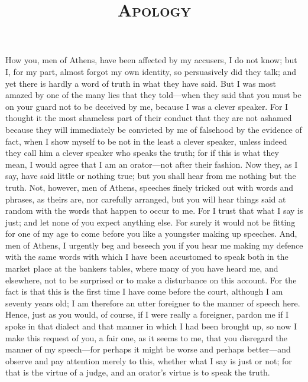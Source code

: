 \documentclass[letterpaper,12pt]{article}
\title{\vspace{-2.5cm} \scshape Apology \vspace{-8mm}}
\author{}
\date{
	\vspace{-1em}
		\small \fontfamily{ppl}\selectfont Written by Plato, translated by Harold North Fowler, 1966
	\vspace{-0.5em}
	\begin{center}
		\hrulefill
	\end{center}
		\vspace{-1em}
	}
\newcommand{\stephpag}[1]{\marginnote{\small\itshape\fontfamily{ppl}\selectfont #1}}
\begin{document}
\begin{minipage}{15.45cm}
\maketitle

\end{minipage}
\setlength{\parindent}{2em}

\stephpag{17 a}How you, men of Athens, have been affected by my accusers, I do not know; but I, for my part, almost forgot my own identity, so persuasively did they talk; and yet there is hardly a word of truth in what they have said. But I was most amazed by one of the many lies that they told---when they said that you must be on your guard not to be deceived by me, \stephpag{b} because I was a clever speaker. For I thought it the most shameless part of their conduct that they are not ashamed because they will immediately be convicted by me of falsehood by the evidence of fact, when I show myself to be not in the least a clever speaker, unless indeed they call him a clever speaker who speaks the truth; for if this is what they mean, I would agree that I am an orator---not after their fashion. Now they, as I say, have said little or nothing true; but you shall hear from me nothing but the truth. Not, however, men of Athens, speeches finely tricked out with words and phrases, \stephpag{c} as theirs are, nor carefully arranged, but you will hear things said at random with the words that happen to occur to me. For I trust that what I say is just; and let none of you expect anything else. For surely it would not be fitting for one of my age to come before you like a youngster making up speeches. And, men of Athens, I urgently beg and beseech you if you hear me making my defence with the same words with which I have been accustomed to speak both in the market place at the bankers tables, where many of you have heard me, and elsewhere, \stephpag{d} not to be surprised or to make a disturbance on this account. For the fact is that this is the first time I have come before the court, although I am seventy years old; I am therefore an utter foreigner to the manner of speech here. Hence, just as you would, of course, if I were really a foreigner, pardon me if I spoke in that dialect and that manner \stephpag{18 a} in which I had been brought up, so now I make this request of you, a fair one, as it seems to me, that you disregard the manner of my speech---for perhaps it might be worse and perhaps better---and observe and pay attention merely to this, whether what I say is just or not; for that is the virtue of a judge, and an orator's virtue is to speak the truth.
\end{document}

